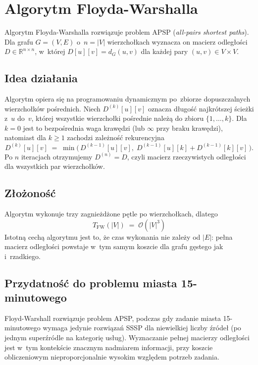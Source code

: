 \section{Algorytm Floyda-Warshalla}
\label{sec:sssp:fw}

Algorytm Floyda-Warshalla \cite{floyd1962,warshall1962} rozwiązuje
problem APSP (\emph{all-pairs shortest paths}). Dla grafu $G=(V,E)$
o~$n=|V|$ wierzchołkach wyznacza on macierz odległości
$D\in\mathbb{R}^{n\times n}$, w~której $D[u][v]=d_G(u,v)$ dla każdej
pary $(u,v)\in V\times V$.

\subsection{Idea działania}

Algorytm opiera się na programowaniu dynamicznym po~zbiorze dopuszczalnych
wierzchołków pośrednich. Niech $D^{(k)}[u][v]$ oznacza długość
najkrótszej ścieżki z~$u$ do~$v$, której wszystkie wierzchołki pośrednie
należą do zbioru $\{1,\dots,k\}$. Dla $k=0$ jest to bezpośrednia waga
krawędzi (lub $\infty$ przy braku krawędzi), natomiast dla $k\ge 1$
zachodzi zależność rekurencyjna
\[
D^{(k)}[u][v] \;=\; \min\bigl(\, D^{(k-1)}[u][v],\; D^{(k-1)}[u][k] + D^{(k-1)}[k][v] \,\bigr).
\]
Po $n$ iteracjach otrzymujemy $D^{(n)}=D$, czyli macierz rzeczywistych
odległości dla wszystkich par wierzchołków.

\clearpage

\subsection{Złożoność}

Algorytm wykonuje trzy zagnieżdżone pętle po wierzchołkach, dlatego
\[
T_{\mathrm{FW}}(|V|) \;=\; \mathcal{O}(|V|^3)
\]
Istotną cechą algorytmu jest to, że czas wykonania nie zależy od $|E|$:
pełna macierz odległości powstaje w~tym samym koszcie dla grafu gęstego
jak i~rzadkiego.

\subsection{Przydatność do problemu miasta 15-minutowego}

Floyd-Warshall rozwiązuje problem APSP, podczas gdy zadanie miasta 15-minutowego wymaga jedynie rozwiązań SSSP dla niewielkiej liczby źródeł
(po jednym superźródle na kategorię usług). Wyznaczanie pełnej macierzy
odległości jest w~tym kontekście znacznym nadmiarem informacji, przy
koszcie obliczeniowym nieproporcjonalnie wysokim względem potrzeb zadania.

